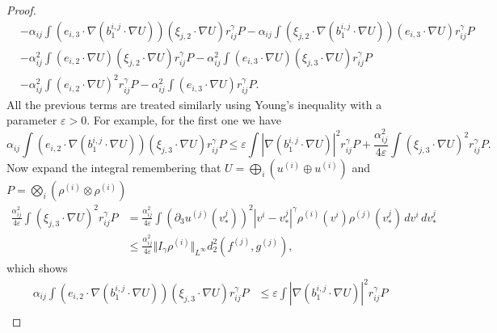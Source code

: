 \documentclass[10pt,a4paper]{amsart}
\begin{document}
\begin{proof}
\begin{align*}
    & -\alpha_{ij}\int\left(e_{i,3}\cdot\nabla\left(b_{1}^{i,j}\cdot\nabla U\right)\right)\left(\xi_{j,2}\cdot\nabla U\right)r_{ij}^{\gamma}P
    -\alpha_{ij}\int\left(\xi_{j,2}\cdot\nabla\left(b_{1}^{i,j}\cdot\nabla U\right)\right)\left(e_{i,3}\cdot\nabla U\right)r_{ij}^{\gamma}P\\
    & -\alpha_{ij}^{2}\int\left(e_{i,2}\cdot\nabla U\right)\left(\xi_{j,2}\cdot\nabla U\right)r_{ij}^{\gamma}P
    -\alpha_{ij}^{2}\int\left(e_{i,3}\cdot\nabla U\right)\left(\xi_{j,3}\cdot\nabla U\right)r_{ij}^{\gamma}P\\
    & -\alpha_{ij}^{2}\int\left(e_{i,2}\cdot\nabla U\right)^{2}r_{ij}^{\gamma}P
    -\alpha_{ij}^{2}\int\left(e_{i,3}\cdot\nabla U\right)r_{ij}^{\gamma}P.
  \end{align*}
  All the previous terms are treated similarly using Young's inequality with a parameter $\varepsilon>0$. For example, for the first one we have
  \begin{equation*}
    \alpha_{ij}\int\left(e_{i,2}\cdot\nabla\left(b_{1}^{i,j}\cdot\nabla U\right)\right)\left(\xi_{j,3}\cdot\nabla U\right)r_{ij}^{\gamma}P\leq\varepsilon\int\left|\nabla\left(b_{1}^{i,j}\cdot\nabla U\right)\right|^{2}r_{ij}^{\gamma}P+\frac{\alpha_{ij}^{2}}{4\varepsilon}\int\left(\xi_{j,3}\cdot\nabla U\right)^{2}r_{ij}^{\gamma}P.
  \end{equation*}
  Now expand the integral remembering that $U=\bigoplus_{i}(u^{(i)}\oplus u^{(i)})$ and $P=\bigotimes_{i}(\rho^{(i)}\otimes\rho^{(i)})$
  \begin{align*}
    \frac{\alpha_{ij}^{2}}{4\varepsilon}\int\left(\xi_{j,3}\cdot\nabla U\right)^{2}r_{ij}^{\gamma}P &
    =\frac{\alpha_{ij}^{2}}{4\varepsilon}\int\left(\partial_{3}u^{(j)}(v^{j}_*)\right)^{2}|v^{i}-v_*^{j}|^{\gamma}\rho^{(i)}(v^{i})\rho^{(j)}(v_*^{j})\,dv^{i}\,dv_*^{j}	\\
    & \leq\frac{\alpha_{ij}^{2}}{4\varepsilon}\Vert I_{\gamma}\rho^{(i)}\Vert _{L^{\infty}}d_{2}^{2}(f^{(j)},g^{(j)}),
  \end{align*}
  which shows
  \begin{align*}
    \alpha_{ij}\int\left(e_{i,2}\cdot\nabla\left(b_{1}^{i,j}\cdot\nabla U\right)\right)\left(\xi_{j,3}\cdot\nabla U\right)r_{ij}^{\gamma}P &
    \leq \varepsilon\int\left|\nabla\left(b_{1}^{i,j}\cdot\nabla U\right)\right|^{2}r_{ij}^{\gamma}P	\\

\end{align*}
\end{proof}
\end{document}
